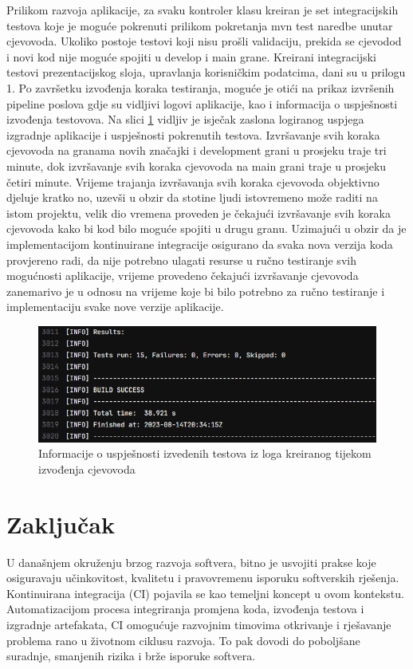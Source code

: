 \documentclass[a4paper,12pt,oneside]{article}
\begin{document}
Prilikom razvoja aplikacije, za svaku kontroler klasu kreiran je set integracijskih testova koje je moguće pokrenuti prilikom pokretanja mvn test naredbe unutar cjevovoda. Ukoliko postoje testovi koji nisu prošli validaciju, prekida se cjevodod i novi kod nije moguće spojiti u develop i main grane. Kreirani integracijski testovi prezentacijskog sloja, upravlanja korisničkim podatcima, dani su u prilogu 1. Po završetku izvođenja koraka testiranja, moguće je otići na prikaz izvršenih pipeline poslova gdje su vidljivi logovi aplikacije, kao i informacija o uspješnosti izvođenja testovova. Na slici \ref{fig:test-log} vidljiv je isječak zaslona logiranog uspjega izgradnje aplikacije i uspješnosti pokrenutih testova. Izvršavanje svih koraka cjevovoda na granama novih značajki i development grani u prosjeku traje tri minute, dok izvršavanje svih koraka cjevovoda na main grani traje u prosjeku četiri minute. Vrijeme trajanja izvršavanja svih koraka cjevovoda objektivno djeluje kratko no, uzevši u obzir da stotine ljudi istovremeno može raditi na istom projektu, velik dio vremena proveden je čekajući izvršavanje svih koraka cjevovoda kako bi kod bilo moguće spojiti u drugu granu. Uzimajući u obzir da je implementacijom kontinuirane integracije osigurano da svaka nova verzija koda provjereno radi, da nije potrebno ulagati resurse u ručno testiranje svih mogućnosti aplikacije, vrijeme provedeno čekajući izvršavanje cjevovoda zanemarivo je u odnosu na vrijeme koje bi bilo potrebno za ručno testiranje i implementaciju svake nove verzije aplikacije. 

\begin{figure}
    \centering
    \includegraphics[width=0.6\linewidth]{Slike/test-log.png}
    \caption{Informacije o uspješnosti izvedenih testova iz loga kreiranog tijekom izvođenja cjevovoda}
    \label{fig:test-log}
\end{figure}

\newpage
\section*{Zaključak}

U današnjem okruženju brzog razvoja softvera, bitno je usvojiti prakse koje osiguravaju učinkovitost, kvalitetu i pravovremenu isporuku softverskih rješenja. Kontinuirana integracija (CI) pojavila se kao temeljni koncept u ovom kontekstu. Automatizacijom procesa integriranja promjena koda, izvođenja testova i izgradnje artefakata, CI omogućuje razvojnim timovima otkrivanje i rješavanje problema rano u životnom ciklusu razvoja. To pak dovodi do poboljšane suradnje, smanjenih rizika i brže isporuke softvera.
\end{document}
